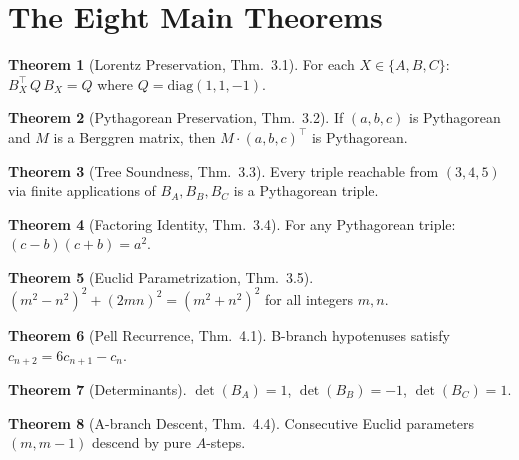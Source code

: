 \documentclass[11pt,twoside,openright]{book}
\theoremstyle{definition}
\newtheorem{theorem}{Theorem}[chapter]
\begin{document}
\section{The Eight Main Theorems}

\begin{theorem}[Lorentz Preservation, Thm.~3.1]
For each $X \in \{A, B, C\}$: $B_X^\top\, Q\, B_X = Q$ where
$Q = \mathrm{diag}(1,1,-1)$.
\end{theorem}

\begin{theorem}[Pythagorean Preservation, Thm.~3.2]
If $(a,b,c)$ is Pythagorean and $M$ is a Berggren matrix, then
$M \cdot (a,b,c)^\top$ is Pythagorean.
\end{theorem}

\begin{theorem}[Tree Soundness, Thm.~3.3]
Every triple reachable from $(3,4,5)$ via finite applications of
$B_A, B_B, B_C$ is a Pythagorean triple.
\end{theorem}

\begin{theorem}[Factoring Identity, Thm.~3.4]
For any Pythagorean triple: $(c-b)(c+b) = a^2$.
\end{theorem}

\begin{theorem}[Euclid Parametrization, Thm.~3.5]
$(m^2-n^2)^2 + (2mn)^2 = (m^2+n^2)^2$ for all integers $m, n$.
\end{theorem}

\begin{theorem}[Pell Recurrence, Thm.~4.1]
B-branch hypotenuses satisfy $c_{n+2} = 6c_{n+1} - c_n$.
\end{theorem}

\begin{theorem}[Determinants]
$\det(B_A) = 1$, $\det(B_B) = -1$, $\det(B_C) = 1$.
\end{theorem}

\begin{theorem}[A-branch Descent, Thm.~4.4]
Consecutive Euclid parameters $(m, m-1)$ descend by pure $A$-steps.
\end{theorem}
\end{document}
